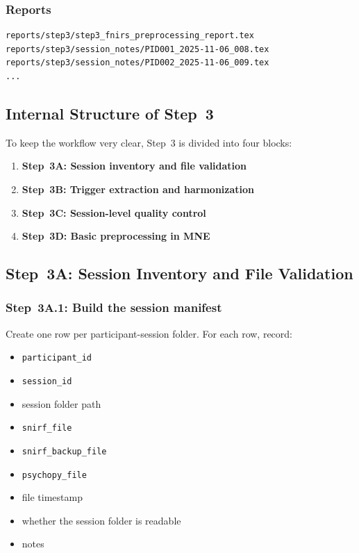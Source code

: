 \documentclass[11pt]{article}
\begin{document}
\subsubsection*{Reports}
\begin{verbatim}
reports/step3/step3_fnirs_preprocessing_report.tex
reports/step3/session_notes/PID001_2025-11-06_008.tex
reports/step3/session_notes/PID002_2025-11-06_009.tex
...
\end{verbatim}

\subsection{Internal Structure of Step~3}
To keep the workflow very clear, Step~3 is divided into four blocks:
\begin{enumerate}
    \item \textbf{Step~3A: Session inventory and file validation}
    \item \textbf{Step~3B: Trigger extraction and harmonization}
    \item \textbf{Step~3C: Session-level quality control}
    \item \textbf{Step~3D: Basic preprocessing in MNE}
\end{enumerate}

\subsection{Step~3A: Session Inventory and File Validation}

\subsubsection{Step~3A.1: Build the session manifest}
Create one row per participant-session folder.
For each row, record:
\begin{itemize}
    \item \texttt{participant\_id}
    \item \texttt{session\_id}
    \item session folder path
    \item \texttt{snirf\_file}
    \item \texttt{snirf\_backup\_file}
    \item \texttt{psychopy\_file}
    \item file timestamp
    \item whether the session folder is readable
    \item notes
\end{itemize}
\end{document}
